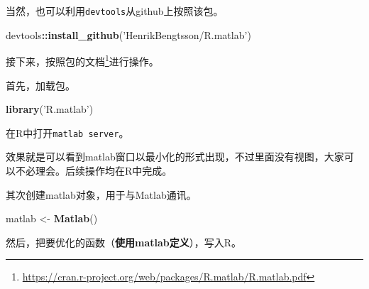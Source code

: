 \documentclass[]{ctexbook}
\newenvironment{Shaded}{\begin{snugshade}}{\end{snugshade}}
\newcommand{\KeywordTok}[1]{\textcolor[rgb]{0.13,0.29,0.53}{\textbf{#1}}}
\newcommand{\StringTok}[1]{\textcolor[rgb]{0.31,0.60,0.02}{#1}}
\newcommand{\OperatorTok}[1]{\textcolor[rgb]{0.81,0.36,0.00}{\textbf{#1}}}
\newcommand{\NormalTok}[1]{#1}
\renewcommand{\href}[2]{#2\footnote{\url{#1}}}
\begin{document}
当然，也可以利用\texttt{devtools}从github上按照该包。

\begin{Shaded}
\begin{Highlighting}[]
\NormalTok{devtools}\OperatorTok{::}\KeywordTok{install_github}\NormalTok{(}\StringTok{'HenrikBengtsson/R.matlab'}\NormalTok{)}
\end{Highlighting}
\end{Shaded}

接下来，按照\href{https://cran.r-project.org/web/packages/R.matlab/R.matlab.pdf}{包的文档}进行操作。

首先，加载包。

\begin{Shaded}
\begin{Highlighting}[]
\KeywordTok{library}\NormalTok{(}\StringTok{'R.matlab'}\NormalTok{)}
\end{Highlighting}
\end{Shaded}

在R中打开\texttt{matlab\ server}。

\begin{Shaded}
\end{Shaded}

效果就是可以看到matlab窗口以最小化的形式出现，不过里面没有视图，大家可以不必理会。后续操作均在R中完成。

其次创建matlab对象，用于与Matlab通讯。

\begin{Shaded}
\begin{Highlighting}[]
\NormalTok{matlab <-}\StringTok{ }\KeywordTok{Matlab}\NormalTok{()}
\end{Highlighting}
\end{Shaded}

然后，把要优化的函数（\textbf{使用matlab定义}），写入R。

\begin{Shaded}
\end{Shaded}
\end{document}
